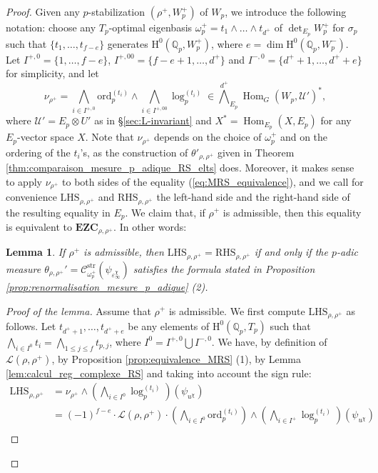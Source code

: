 \documentclass[12pt]{amsart}
\newcommand\Qp{{\mathbb{Q}_p}}
\newcommand\cL{\mathcal{L}}
\newcommand\cU{\mathcal{U}}
\newcommand\sC{\mathscr{C}}
\newcommand{\str}{\mathrm{str}}
\newcommand{\ord}{\mathrm{ord}}
\DeclareMathOperator{\Hom}{Hom}
\newcommand{\HH}{\mathrm{H}}
\theoremstyle{defstyle}
\theoremstyle{thmstyle}
\newtheorem{lemme}[subsubsection]{Lemma}
\begin{document}
\begin{proof}
    Given any $p$-stabilization $(\rho^+,W_p^+)$ of $W_p$, we introduce the following notation: choose any $T_p$-optimal eigenbasis $\omega_p^+=t_1\wedge\ldots\wedge t_{d^+}$ of $\det_{E_p}W_p^+$ for $\sigma_p$ such that $\{t_1,\ldots,t_{f-e}\}$ generates $\HH^0(\Qp,W_p^+)$, where $e=\dim \HH^0(\Qp,W_p^-)$. Let $I^{+,0}=\{1,\ldots,f-e\}$, $I^{+,00}=\{f-e+1,\ldots,d^+\}$ and $I^{-,0}=\{d^++1,\ldots,d^++e\}$ for simplicity, and let 
	$$\nu_{\rho^+}=\bigwedge_{i\in I^{+,0}}\ord_p^{(t_i)}\wedge \bigwedge_{i\in I^{+,00}} \log_p^{(t_{i})} \in {\bigwedge^{d^+}}_{E_p}\Hom_G(W_p,\cU')^*,$$
	where $\cU'=E_p \otimes U'$ as in \S\ref{sec:L-invariant} and  $X^*=\Hom_{E_p}(X,E_p)$ for any $E_p$-vector space $X$. Note that $\nu_{\rho^+}$ depends on the choice of $\omega_p^+$ and on the ordering of the $t_i$'s, as the construction of $\theta'_{\rho,\rho^+}$ given in Theorem \ref{thm:comparaison_mesure_p_adique_RS_elts} does. Moreover, it makes sense to apply $\nu_{\rho^+}$ to both sides of the equality (\ref{eq:MRS_equivalence}), and we call for convenience $\textrm{LHS}_{\rho,\rho^+}$ and $\textrm{RHS}_{\rho,\rho^+}$ the left-hand side and the right-hand side of the resulting equality in $E_p$. We claim that, if $\rho^+$ is admissible, then this equality is equivalent to $\textbf{EZC}_{\rho,\rho^+}$. In other words:
	\begin{lemme}\label{lem:LHS_RHS}
		If $\rho^+$ is admissible, then $\textrm{LHS}_{\rho,\rho^+}=\textrm{RHS}_{\rho,\rho^+}$ if and only if the $p$-adic measure $\theta_{\rho,\rho^+}'=\sC^\str_{\omega_p^+}(\psi_{\varepsilon_\infty^\chi})$ satisfies the formula stated in Proposition \ref{prop:renormalisation_mesure_p_adique} (2).
	\end{lemme}
	\begin{proof}[Proof of the lemma]
		Assume that $\rho^+$ is admissible. We first compute $\textrm{LHS}_{\rho,\rho^+}$ as follows. Let $t_{d^++1},\ldots,t_{d^++e}$ be any elements of $\HH^0(\Qp,T_p)$ such that $\bigwedge_{i\in I^{0}} t_i=\bigwedge_{1\leq j\leq f}t_{p,j}$, where $I^0=I^{+,0}\bigcup I^{-,0}$. 
	 We have, by definition of $\cL(\rho,{\rho}^+)$, by Proposition \ref{prop:equivalence_MRS} (1), by Lemma \ref{lem:calcul_reg_complexe_RS} and taking into account the sign rule:
	\begin{align*}
	\textrm{LHS}_{\rho,\rho^+}&= \nu_{\rho^+}\wedge \left(\bigwedge_{i\in I^0} \log_p^{(t_{i})}\right)(\psi_{u^\chi})\\
	&=(-1)^{f-e}\cdot \cL(\rho,{\rho}^+)\cdot \left(\bigwedge_{i\in I^0} \ord_p^{(t_{i})}\right)\wedge \left(\bigwedge_{i\in I^+} \log_p^{(t_i)}\right)(\psi_{u^\chi}) \\

\end{align*}
\end{proof}
\end{proof}
\end{document}
